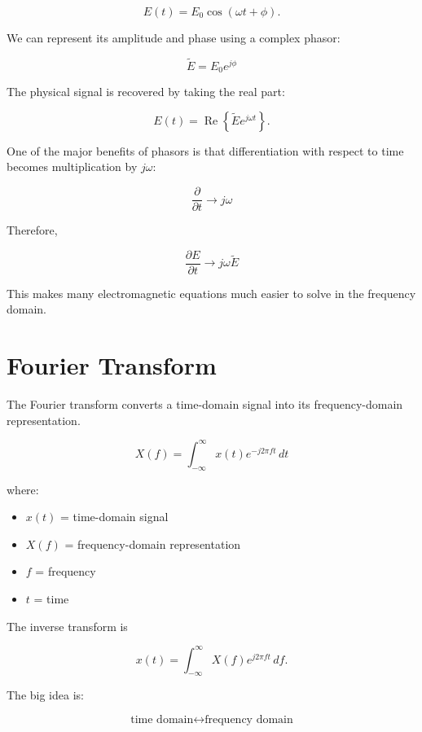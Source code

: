 \documentclass[11pt]{article}
\begin{document}
\[
E(t)
=
E_0\cos(\omega t+\phi).
\]

We can represent its amplitude and phase using a complex phasor:

\[
\boxed{
\tilde{E}
=
E_0e^{j\phi}
}
\]

The physical signal is recovered by taking the real part:

\[
E(t)
=
\operatorname{Re}
\left\{
\tilde{E}e^{j\omega t}
\right\}.
\]

One of the major benefits of phasors is that differentiation with respect to time becomes multiplication by $j\omega$:

\[
\boxed{
\frac{\partial}{\partial t}
\longrightarrow
j\omega
}
\]

Therefore,

\[
\boxed{
\frac{\partial E}{\partial t}
\longrightarrow
j\omega\tilde{E}
}
\]

This makes many electromagnetic equations much easier to solve in the frequency domain.



\section{Fourier Transform}

The Fourier transform converts a time-domain signal into its frequency-domain representation.

\[
\boxed{
X(f)
=
\int_{-\infty}^{\infty}
x(t)e^{-j2\pi ft}\,dt
}
\]

where:

\begin{itemize}
    \item $x(t)$ = time-domain signal
    \item $X(f)$ = frequency-domain representation
    \item $f$ = frequency
    \item $t$ = time
\end{itemize}

The inverse transform is

\[
x(t)
=
\int_{-\infty}^{\infty}
X(f)e^{j2\pi ft}\,df.
\]

The big idea is:

\[
\boxed{
\text{time domain}
\longleftrightarrow
\text{frequency domain}
}
\]


\end{document}

